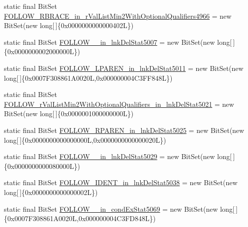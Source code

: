\begin{DoxyCompactItemize}
static final Bit\-Set \hyperlink{classorg_1_1tzi_1_1use_1_1parser_1_1shell_1_1_shell_command_parser_afabe382316fae8ef6e4d247b244b8f3b}{F\-O\-L\-L\-O\-W\-\_\-\-R\-B\-R\-A\-C\-E\-\_\-in\-\_\-r\-Val\-List\-Min2\-With\-Optional\-Qualifiers4966} = new Bit\-Set(new long\mbox{[}$\,$\mbox{]}\{0x0000000000000402\-L\})
\item 
static final Bit\-Set \hyperlink{classorg_1_1tzi_1_1use_1_1parser_1_1shell_1_1_shell_command_parser_a55247482fb8bb9ec863948e598297a93}{F\-O\-L\-L\-O\-W\-\_\-\_\-in\-\_\-lnk\-Del\-Stat5007} = new Bit\-Set(new long\mbox{[}$\,$\mbox{]}\{0x0000000002000000\-L\})
\item 
static final Bit\-Set \hyperlink{classorg_1_1tzi_1_1use_1_1parser_1_1shell_1_1_shell_command_parser_a962e3b0ba74acc2166d27c56bd39237a}{F\-O\-L\-L\-O\-W\-\_\-\-L\-P\-A\-R\-E\-N\-\_\-in\-\_\-lnk\-Del\-Stat5011} = new Bit\-Set(new long\mbox{[}$\,$\mbox{]}\{0x0007\-F308861\-A0020\-L,0x000000004\-C3\-F\-F848\-L\})
\item 
static final Bit\-Set \hyperlink{classorg_1_1tzi_1_1use_1_1parser_1_1shell_1_1_shell_command_parser_a5a9a457c6399364ed2cb4023234d7e72}{F\-O\-L\-L\-O\-W\-\_\-r\-Val\-List\-Min2\-With\-Optional\-Qualifiers\-\_\-in\-\_\-lnk\-Del\-Stat5021} = new Bit\-Set(new long\mbox{[}$\,$\mbox{]}\{0x0000001000000000\-L\})
\item 
static final Bit\-Set \hyperlink{classorg_1_1tzi_1_1use_1_1parser_1_1shell_1_1_shell_command_parser_a5fb3f7a78efa741838c5bfff6170cd65}{F\-O\-L\-L\-O\-W\-\_\-\-R\-P\-A\-R\-E\-N\-\_\-in\-\_\-lnk\-Del\-Stat5025} = new Bit\-Set(new long\mbox{[}$\,$\mbox{]}\{0x0000000000000000\-L,0x0000000000000020\-L\})
\item 
static final Bit\-Set \hyperlink{classorg_1_1tzi_1_1use_1_1parser_1_1shell_1_1_shell_command_parser_a28489e5b852c3b16b684bf429328efce}{F\-O\-L\-L\-O\-W\-\_\-\_\-in\-\_\-lnk\-Del\-Stat5029} = new Bit\-Set(new long\mbox{[}$\,$\mbox{]}\{0x0000000000080000\-L\})
\item 
static final Bit\-Set \hyperlink{classorg_1_1tzi_1_1use_1_1parser_1_1shell_1_1_shell_command_parser_a0156aefea1abae02df264f213c76fae8}{F\-O\-L\-L\-O\-W\-\_\-\-I\-D\-E\-N\-T\-\_\-in\-\_\-lnk\-Del\-Stat5038} = new Bit\-Set(new long\mbox{[}$\,$\mbox{]}\{0x0000000000000002\-L\})
\item 
static final Bit\-Set \hyperlink{classorg_1_1tzi_1_1use_1_1parser_1_1shell_1_1_shell_command_parser_aaee32d2258e8950612d80af8d7aca61b}{F\-O\-L\-L\-O\-W\-\_\-\_\-in\-\_\-cond\-Ex\-Stat5069} = new Bit\-Set(new long\mbox{[}$\,$\mbox{]}\{0x0007\-F308861\-A0020\-L,0x000000004\-C3\-F\-D848\-L\})

\end{DoxyCompactItemize}
